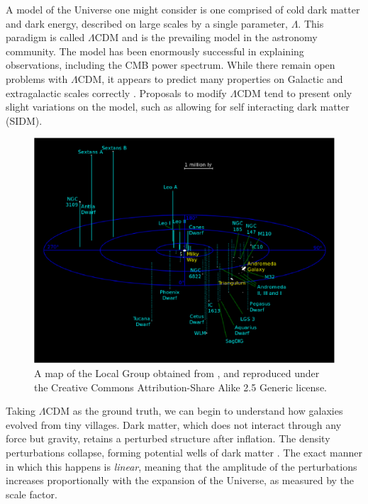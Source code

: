 A model of the Universe one might consider is one comprised of cold dark matter and dark energy, described on large scales by a single parameter, $\Lambda$. This paradigm is called $\Lambda$CDM and is the prevailing model in the astronomy community. The model has been enormously successful in explaining observations, including the CMB power spectrum. While there remain open problems with $\Lambda$CDM, it appears to predict many properties on Galactic and extragalactic scales correctly \citep{kolb_turner,dodelson, BT}. Proposals to modify $\Lambda$CDM tend to present only slight variations on the model, such as allowing for self interacting dark matter (SIDM).
\begin{figure}
	\includegraphics[width=\textwidth]{../figures/local_group}
	\caption{A map of the Local Group obtained from \citet{local_group_map}, and reproduced under the Creative Commons Attribution-Share Alike 2.5 Generic license.}\label{fig:local_group}
\end{figure}


Taking $\Lambda$CDM as the ground truth, we can begin to understand how galaxies evolved from tiny villages. Dark matter, which does not interact through any force but gravity, retains a perturbed structure after inflation. The density perturbations collapse, forming potential wells of dark matter \citep{taylor_2011}. The exact manner in which this happens is \textit{linear}, meaning that the amplitude of the perturbations increases proportionally with the expansion of the Universe, as measured by the scale factor. 

